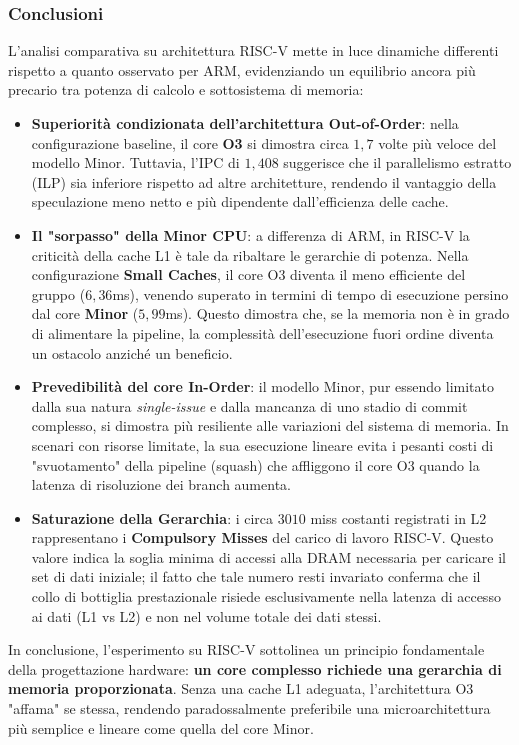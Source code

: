 \documentclass[../../main_document/main.tex]{subfiles}
\begin{document}
\subsubsection{Conclusioni}
L'analisi comparativa su architettura RISC-V mette in luce dinamiche differenti rispetto a quanto osservato per ARM, evidenziando un equilibrio ancora più precario tra potenza di calcolo e sottosistema di memoria:
\begin{itemize}[leftmargin=1em]
    \item \textbf{Superiorità condizionata dell'architettura Out-of-Order}: nella configurazione baseline, il core \textbf{O3} si dimostra circa $1,7$ volte più veloce del modello Minor. Tuttavia, l'IPC di $1,408$ suggerisce che il parallelismo estratto (ILP) sia inferiore rispetto ad altre architetture, rendendo il vantaggio della speculazione meno netto e più dipendente dall'efficienza delle cache.
    \item \textbf{Il "sorpasso" della Minor CPU}: a differenza di ARM, in RISC-V la criticità della cache L1 è tale da ribaltare le gerarchie di potenza. Nella configurazione \textbf{Small Caches}, il core O3 diventa il meno efficiente del gruppo ($6,36$ms), venendo superato in termini di tempo di esecuzione persino dal core \textbf{Minor} ($5,99$ms). Questo dimostra che, se la memoria non è in grado di alimentare la pipeline, la complessità dell'esecuzione fuori ordine diventa un ostacolo anziché un beneficio.
    \item \textbf{Prevedibilità del core In-Order}: il modello Minor, pur essendo limitato dalla sua natura \textit{single-issue} e dalla mancanza di uno stadio di commit complesso, si dimostra più resiliente alle variazioni del sistema di memoria. In scenari con risorse limitate, la sua esecuzione lineare evita i pesanti costi di "svuotamento" della pipeline (squash) che affliggono il core O3 quando la latenza di risoluzione dei branch aumenta.
    \item \textbf{Saturazione della Gerarchia}: i circa $3010$ miss costanti registrati in L2 rappresentano i \textbf{Compulsory Misses} del carico di lavoro RISC-V. Questo valore indica la soglia minima di accessi alla DRAM necessaria per caricare il set di dati iniziale; il fatto che tale numero resti invariato conferma che il collo di bottiglia prestazionale risiede esclusivamente nella latenza di accesso ai dati (L1 vs L2) e non nel volume totale dei dati stessi.
\end{itemize}

\vspace{8pt}
\noindent
In conclusione, l'esperimento su RISC-V sottolinea un principio fondamentale della progettazione hardware: \textbf{un core complesso richiede una gerarchia di memoria proporzionata}. Senza una cache L1 adeguata, l'architettura O3 "affama" se stessa, rendendo paradossalmente preferibile una microarchitettura più semplice e lineare come quella del core Minor.
\end{document}
